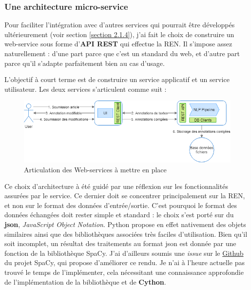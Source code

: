 \subsubsection{Une architecture micro-service}
Pour faciliter l'intégration avec d'autres services qui pourrait être développés ultérieurement (voir section \ref{section 2.1.4}), j'ai fait le choix de construire un web-service sous forme d'\textbf{API REST} qui effectue la REN. Il s'impose assez naturellement : d'une part parce que c'est un standard du web, et d'autre part parce qu'il s'adapte parfaitement bien au cas d'usage.
\newline

L'objectif à court terme est de construire un service applicatif et un service utilisateur. Les deux services s'articulent comme suit :
\vspace{20pt}
\begin{figure}[H]
    \centering
\includegraphics[scale=0.62]{images/Archi-pipeline-web.png}
    \caption{Articulation des Web-services à mettre en place}
    \label{fig:archi-pipeline-web}
\end{figure}

Ce choix d'architecture à été guidé par une réflexion sur les fonctionnalités assurées par le service. Ce dernier doit se concentrer principalement sur la REN, et non sur le format des données d'entrée/sortie. C'est pourquoi le format des données échangées doit rester simple et standard : le choix s'est porté sur du \textbf{json}, \textit{JavaScript Object Notation}. Python propose en effet nativement des objets similaires ainsi que des bibliothèques associées très faciles d'utilisation. Bien qu'il soit incomplet, un résultat des traitements au format json est donnée par une fonction de la bibliothèque SpaCy. J'ai d'ailleurs soumis une \textit{issue} sur le \href{https://github.com/explosion/spaCy/issues/3987}{Github} du projet SpaCy, qui propose d'améliorer ce rendu. Je n'ai à l'heure actuelle pas trouvé le temps de l'implémenter, cela nécessitant une connaissance approfondie de l'implémentation de la bibliothèque et de \textbf{Cython}.

